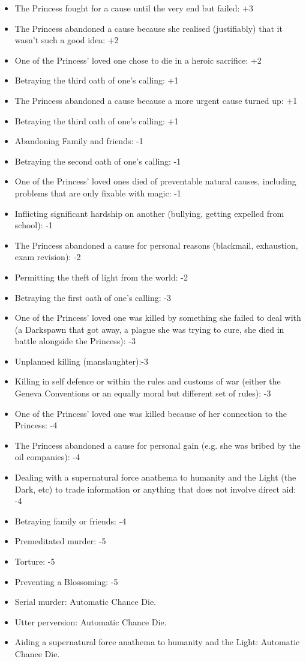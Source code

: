 \begin{itemize}
 \item The Princess fought for a cause until the very end but failed: +3
 \item The Princess abandoned a cause because she realised (justifiably) that it wasn't such a good idea: +2
 \item One of the Princess' loved one chose to die in a heroic sacrifice: +2
 \item Betraying the third oath of one's calling: +1
 \item The Princess abandoned a cause because a more urgent cause turned up: +1
 \item Betraying the third oath of one's calling: +1
 \item Abandoning Family and friends: -1
 \item Betraying the second oath of one's calling: -1
 \item One of the Princess' loved ones died of preventable natural causes, including problems that are only fixable with magic: -1
 \item Inflicting significant hardship on another (bullying, getting expelled from school): -1
 \item The Princess abandoned a cause for personal reasons (blackmail, exhaustion, exam revision): -2
 \item Permitting the theft of light from the world: -2
 \item Betraying the first oath of one's calling: -3
 \item One of the Princess' loved one was killed by something she failed to deal with (a Darkspawn that got away, a plague she was trying to cure, she died in battle alongside the Princess): -3
 \item Unplanned killing (manslaughter):-3
 \item Killing in self defence or within the rules and customs of war (either the Geneva Conventions or an equally moral but different set of rules): -3 
 \item One of the Princess' loved one was killed because of her connection to the Princess: -4
 \item The Princess abandoned a cause for personal gain (e.g. she was bribed by the oil companies): -4
 \item Dealing with a supernatural force anathema to humanity and the Light (the Dark, etc) to trade information or anything that does not involve direct aid: -4
 \item Betraying family or friends: -4
 \item Premeditated murder: -5
 \item Torture: -5
 \item Preventing a Blossoming: -5
 \item Serial murder: Automatic Chance Die.
 \item Utter perversion: Automatic Chance Die.
 \item Aiding a supernatural force anathema to humanity and the Light: Automatic Chance Die.
 

\end{itemize}
